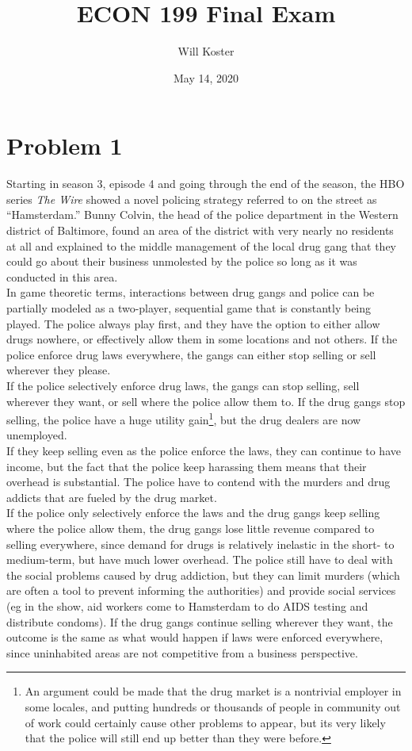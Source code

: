\documentclass[letterpaper]{article}
\begin{document}
\title{ECON 199 Final Exam}
\author{Will Koster}
\date{May 14, 2020}
\maketitle

\clearpage

\section{Problem 1}
Starting in season 3, episode 4 and going through the end of the season, the HBO series \textit{The Wire} showed a novel policing strategy referred to on the street as ``Hamsterdam.'' Bunny Colvin, the head of the police department in the Western district of Baltimore, found an area of the district with very nearly no residents at all and explained to the middle management of the local drug gang that they could go about their business unmolested by the police so long as it was conducted in this area. \\
In game theoretic terms, interactions between drug gangs and police can be partially modeled as a two-player, sequential game that is constantly being played. The police always play first, and they have the option to either allow drugs nowhere, or effectively allow them in some locations and not others. If the police enforce drug laws everywhere, the gangs can either stop selling or sell wherever they please. \\
If the police selectively enforce drug laws, the gangs can stop selling, sell wherever they want, or sell where the police allow them to. If the drug gangs stop selling, the police have a huge utility gain\footnote{An argument could be made that the drug market is a nontrivial employer in some locales, and putting hundreds or thousands of people in community out of work could certainly cause other problems to appear, but its very likely that the police will still end up better than they were before.}, but the drug dealers are now unemployed. \\
If they keep selling even as the police enforce the laws, they can continue to have income, but the fact that the police keep harassing them means that their overhead is substantial. The police have to contend with the murders and drug addicts that are fueled by the drug market. \\
If the police only selectively enforce the laws and the drug gangs keep selling where the police allow them, the drug gangs lose little revenue compared to selling everywhere, since demand for drugs is relatively inelastic in the short- to medium-term, but have much lower overhead. The police still have to deal with the social problems caused by drug addiction, but they can limit murders (which are often a tool to prevent informing the authorities) and provide social services (eg in the show, aid workers come to Hamsterdam to do AIDS testing and distribute condoms). If the drug gangs continue selling wherever they want, the outcome is the same as what would happen if laws were enforced everywhere, since uninhabited areas are not competitive from a business perspective. \\
\end{document}
